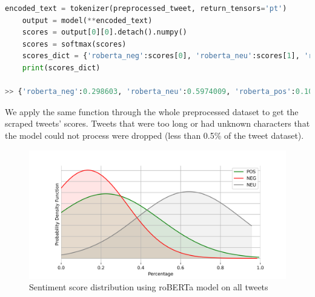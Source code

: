 \begin{lstlisting}[language=Python, caption= {Applying the twitter-roberta-base-sentiment model to the preprocessed tweet in (\ref{preprocess_tweet})}, label= roberta_example]
    encoded_text = tokenizer(preprocessed_tweet, return_tensors='pt')
    output = model(**encoded_text)
    scores = output[0][0].detach().numpy()
    scores = softmax(scores)
    scores_dict = {'roberta_neg':scores[0], 'roberta_neu':scores[1], 'roberta_pos':scores[2]}
    print(scores_dict)

>> {'roberta_neg':0.298603, 'roberta_neu':0.5974009, 'roberta_pos':0.10399604}
\end{lstlisting}
We apply the same function through the whole preprocessed dataset to get the scraped tweets' scores. Tweets that were too long or had unknown characters that the model could not process were dropped (less than 0.5\% of the tweet dataset). 
\begin{figure}[H]
    \centering
    \includegraphics[scale=0.6]{CHAPTER_5/sentiment_score_distribution_python.png}
    \caption{Sentiment score distribution using roBERTa model on all tweets}
    \label{sentiment_score_distribution}
 \end{figure}
